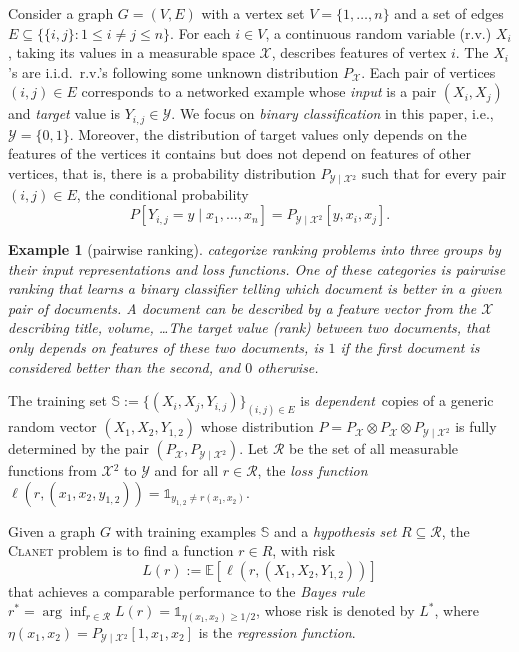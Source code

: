 \documentclass[letterpaper]{article} %
\newtheorem{example}{Example}
\newcommand{\E}{\mathbb{E}}
\newcommand{\indicator}{\mathds 1}
\newcommand{\xspace}{\mathcal{X}}
\newcommand{\yspace}{\mathcal{Y}}
\newcommand{\bayeserror}{L^*}
\newcommand{\distribution}{P}
\newcommand{\risk}{L}
\newcommand{\edge}[1]{\{#1\}}
\newcommand{\pair}[1]{(#1)}
\newcommand{\problemabbr}{\textnormal{C}\textsc{lanet}}
\newcommand{\trainingset}{\mathbb{S}}
\begin{document}
Consider a graph $G=(V,E)$ with a vertex set $V=\{1,\dots,n\}$ and a set of edges $E\subseteq\{\edge{i,j}: 1\le i\neq j\le n\}$. 
For each $i\in V$, a continuous random variable (r.v.) $X_i$, taking its values in a measurable space $\xspace{}$, describes features of vertex $i$. The $X_i$'s are i.i.d.\ r.v.'s following some unknown distribution $P_\xspace$.
Each pair of vertices $\pair{i,j}\in E$ corresponds to a networked example whose \emph{input} is a pair $(X_i,X_j)$ and \emph{target} value is $Y_{i,j}\in\yspace{}.$ 
We focus on \emph{binary classification} in this paper, i.e., $\yspace{} = \{0,1\}$. 
Moreover, the distribution of target values only depends on the features of the vertices it contains but does not depend on features of other vertices, that is, there is a probability distribution $P_{\yspace{}\mid\xspace{}^2}$ such that for every pair $\pair{i,j}\in E$, the conditional probability 
\[P\left[Y_{i,j}=y\mid x_1,\ldots,x_n\right]=P_{\yspace{}\mid\xspace{}^2}\left[y,x_i,x_j\right].\]  

\begin{example}[pairwise ranking]
\cite{liu2009learning} categorize ranking problems into three groups by their input representations and loss functions. One of these categories is \emph{pairwise ranking} that learns a binary classifier telling which document is better in a given pair of documents. A document can be described by a feature vector from the $\xspace$ describing title, volume, \ldots The target value (rank) between two documents, that only depends on features of these two documents, is $1$ if the first document is considered better than the second, and $0$ otherwise. 
\end{example}

The training set $\trainingset:=\{(X_i,X_j,Y_{i,j})\}_{\pair{i,j}\in E}$ is \emph{dependent}\ copies of a generic random vector $(X_1, X_2, Y_{1,2})$ whose distribution $\distribution{}=P_\xspace\otimes P_\xspace\otimes P_{\yspace{}\mid\xspace{}^2}$ is fully determined by the pair $(P_\xspace{}, P_{\yspace{}\mid\xspace{}^2})$. 
Let $\mathcal{R}$ be the set of all measurable functions from $\xspace{}^2$ to $\yspace{}$ and for all $r\in\mathcal{R}$, the \emph{loss function} $\ell(r,(x_1,x_2,y_{1,2}))=\indicator_{y_{1,2}\neq r(x_1,x_2)}$. 

Given a graph $G$ with training examples $\trainingset$ and a \emph{hypothesis set}  $R\subseteq\mathcal{R}$, the \problemabbr{} problem is to find a function $r\in R$, with risk
\begin{equation}
    \label{eq:graph_reconstruction_risk}
    \risk(r) := \E[\ell(r, (X_1,X_2,Y_{1,2}))]
\end{equation}
that achieves a comparable performance to the \emph{Bayes rule} $r^*=\arg\inf_{r\in\mathcal{R}}\risk(r) = \indicator_{\eta(x_1,x_2)\ge 1/2}$, whose risk is denoted by $\bayeserror{}$, where $\eta(x_1,x_2)=P_{\yspace{}\mid\xspace{}^2}[1,x_1,x_2]$ is the \emph{regression function}. 
\end{document}
